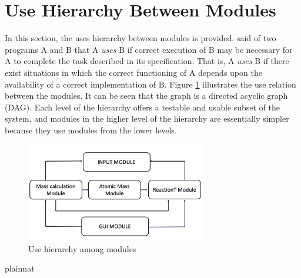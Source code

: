 \documentclass[12pt, titlepage]{article}
\begin{document}

\section{Use Hierarchy Between Modules} \label{SecUse}

In this section, the uses hierarchy between modules is
provided. \cite{Parnas:1978} said of two programs A and B that A {\em uses} B if
correct execution of B may be necessary for A to complete the task described in
its specification. That is, A {\em uses} B if there exist situations in which
the correct functioning of A depends upon the availability of a correct
implementation of B.  Figure \ref{FigUH} illustrates the use relation between
the modules. It can be seen that the graph is a directed acyclic graph
(DAG). Each level of the hierarchy offers a testable and usable subset of the
system, and modules in the higher level of the hierarchy are essentially simpler
because they use modules from the lower levels.

\begin{figure}[H]
\centering
\includegraphics[width=0.7\textwidth]{UseHierarchy.png}
\caption{Use hierarchy among modules}
\label{FigUH}
\end{figure}

\newpage 
 {plainnat}

\end{document}
